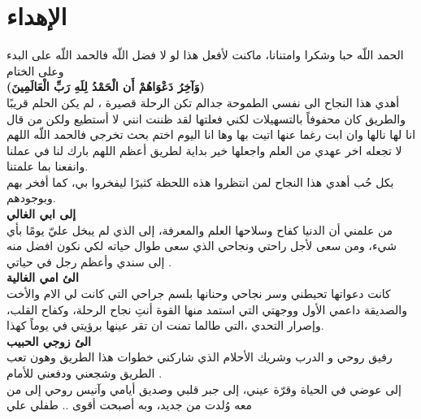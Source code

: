 \chapter*{الإهداء}
\begin{center}
	
	الحمد اللّه حبا وشكرا وامتنانا، ماكنت لأفعل هذا لو لا فضل اللّه فالحمد اللّه على البدء وعلى الختام\\
\textbf{	(وَآخِرُ دَعْوَاهُمْ أَن الْحَمْدُ لِلَهِ رَبِّ الْعَالَمِينَ)}\\
	أهدي هذا النجاح الى نفسي الطموحة جدالم تكن الرحلة قصيرة  ، لم يكن الحلم قريبًا والطريق كان محفوفاً بالتسهيلات لكني فعلتها لقد ظننت انني لا أستطيع ولكن من قال انا لها نالها وان ابت رغما عنها اتيت بها وها انا اليوم اختم بحث تخرجي فالحمد اللّه اللهم لا تجعله اخر عهدي من العلم واجعلها خير بداية لطريق أعظم اللهم بارك لنا في عملنا وانفعنا بما علمتنا.\\
	بكل حُب أهدي هذا النجاح لمن انتظروا هذه اللحظة كثيرًا ليفخروا بي، كما أفخر بهم وبوجودهم.\\
	
\textbf{	إلى ابي الغالي}\\
	من علمني أن الدنيا كفاح وسلاحها العلم والمعرفة، إلى الذي لم يبخل عليّ يومًا بأي شيء، ومن سعى لأجل راحتي ونجاحي الذي سعى طوال حياته لكي نكون افضل منه
	إلى سندي وأعظم رجل في حياتي .\\

\textbf{	الئ امي الغالية}\\
	كانت دعواتها تحيطني وسر نجاحي وحنانها بلسم جراحي التي كانت لي الام والأخت والصديقة داعمي الأول ووجهتي التي  استمد منها القوة أنتِ نجاح الرحلة، وكفاح القلب، وإصرار التحدي ،التي طالما تمنت ان تقر عينها برؤيتي  في يوماً كهذا.\\
	\noindent
\textbf{	الئ زوجي الحبيب}\\
	رفيق روحي و الدرب وشريك الأحلام الذي شاركني خطوات هذا الطريق  وهون تعب الطريق وشجعني ودفعني للأمام .\\
	\noindent
	إلى عوضي في الحياة وقرّة عيني، إلى جبر قلبي وصديق أيامي وآنيس روحي إلى من معه وُلدت من جديد، وبه أصبحت أقوى .. طفلي علي
\end{center}